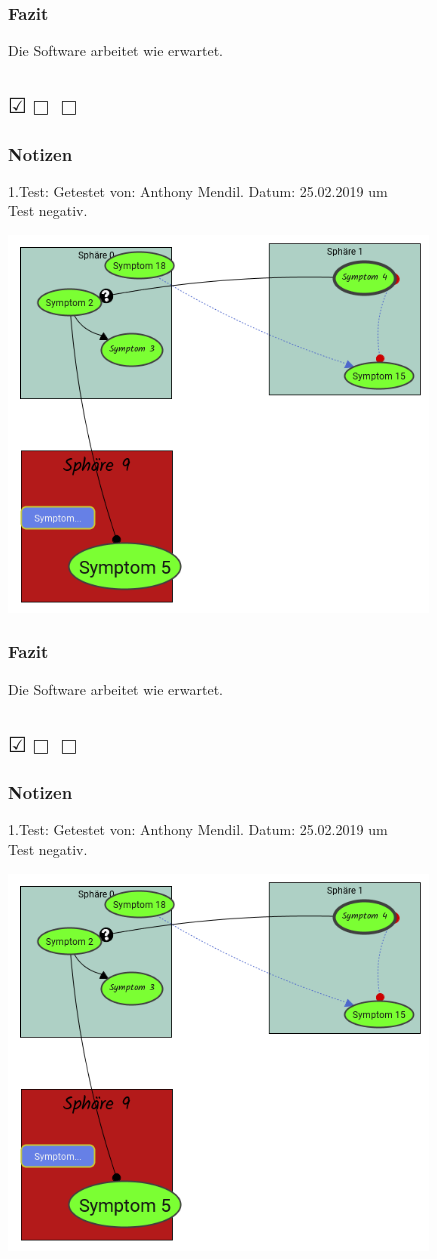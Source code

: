 \documentclass{scrartcl}
\newcommand{\subsectiont}[2]{\subsection[#1]{#1{\normalsize\normalfont #2}}}
\newcommand{\leer}{$\Box$}
\newcommand{\ok}{$\CheckedBox$}
\begin{document}
\subsubsection{Fazit}
Die Software arbeitet wie erwartet.

\subsectiont{}{\dotfill\ok\leer\leer}
\subsubsection{Notizen}
1.Test: Getestet von: Anthony Mendil. Datum: 25.02.2019 um  \\
Test negativ. 
\begin{center}
\includegraphics[height=10cm]{3_42.PNG}
\end{center}
\subsubsection{Fazit}
Die Software arbeitet wie erwartet.

\subsectiont{}{\dotfill\ok\leer\leer}
\subsubsection{Notizen}
1.Test: Getestet von: Anthony Mendil. Datum: 25.02.2019 um  \\
Test negativ. 
\begin{center}
\includegraphics[height=10cm]{3_42.PNG}
\end{center}
\end{document}

